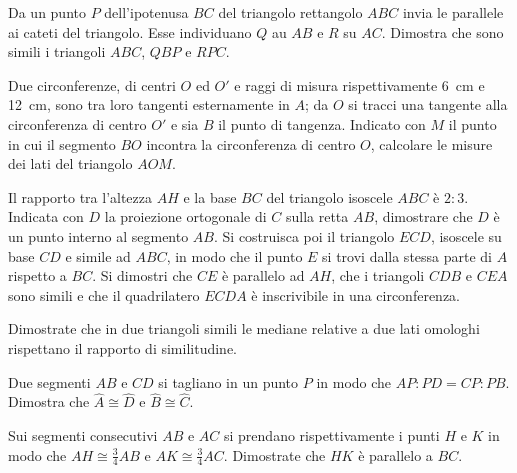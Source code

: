 \begin{multicols}{2}
\begin{esercizio}
\label{ese:6.71}
Da un punto \(P\) dell'ipotenusa \(BC\) del triangolo rettangolo \(ABC\) 
invia le parallele ai cateti del triangolo. Esse individuano \(Q\) au 
\(AB\) e \(R\) su \(AC\). Dimostra che sono simili i triangoli \(ABC\), \(QBP\) 
e \(RPC\).
\end{esercizio}

\begin{esercizio}
\label{ese:6.72}
Due circonferenze, di centri \(O\) ed \(O'\) e raggi di misura 
rispettivamente 6~cm e 12~cm, sono tra loro tangenti esternamente in 
\(A\); da \(O\) si tracci una tangente alla circonferenza di centro \(O'\) 
e sia \(B\) il punto di tangenza. Indicato con \(M\) il punto in cui il 
segmento \(BO\) incontra la circonferenza di centro \(O\), calcolare le 
misure dei lati del triangolo \(AOM\).
\end{esercizio}

\begin{esercizio}
\label{ese:6.73}
Il rapporto tra l'altezza \(AH\) e la base \(BC\) del triangolo isoscele 
\(ABC\) è \(2:3\). Indicata con \(D\) la proiezione ortogonale di \(C\) sulla 
retta \(AB\), dimostrare che \(D\) è un punto interno al segmento \(AB\). 
Si costruisca poi il triangolo \(ECD\), isoscele su base \(CD\) e simile 
ad \(ABC\), in modo che il punto \(E\) si trovi dalla stessa parte di \(A\) 
rispetto a \(BC\). Si dimostri che \(CE\) è parallelo ad \(AH\), che i 
triangoli \(CDB\) e \(CEA\) sono simili e che il quadrilatero \(ECDA\) è 
inscrivibile in una circonferenza.
\end{esercizio}

\begin{esercizio}
\label{ese:6.74}
Dimostrate che in due triangoli simili le mediane relative a due lati 
omologhi rispettano il rapporto di similitudine.
\end{esercizio}

\begin{esercizio}
\label{ese:6.75}
Due segmenti \(AB\) e \(CD\) si tagliano in un punto \(P\) in modo che 
\(AP:PD=CP:PB\). Dimostra che \(\widehat{A}\cong \widehat{D}\) e 
\(\widehat{B}\cong \widehat{C}\).
\end{esercizio}

\begin{esercizio}
\label{ese:6.76}
Sui segmenti consecutivi \(AB\) e \(AC\) si prendano rispettivamente i 
punti \(H\) e \(K\) in modo che \(AH\cong \frac{3}{4}AB\) e \(AK\cong 
\frac{3}{4}AC\). Dimostrate che \(HK\) è parallelo a \(BC\).
\end{esercizio}


\end{multicols}
